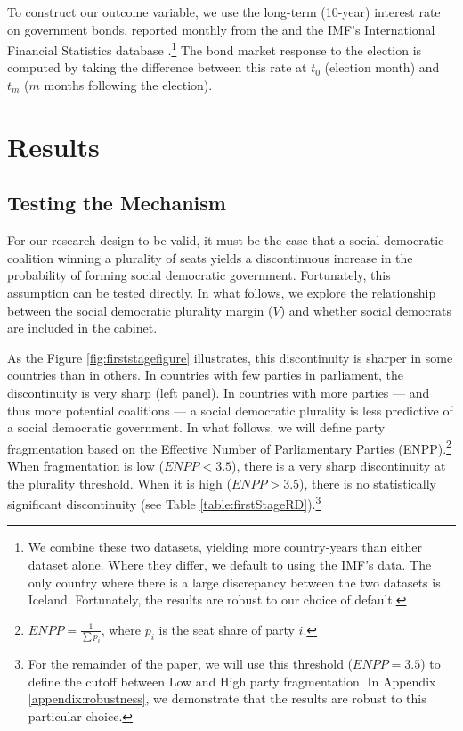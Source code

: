 \documentclass[12pt]{article}
\begin{document}
To construct our outcome variable, we use the long-term (10-year) interest rate on government bonds, reported monthly from the \citet{OECD2018} and the IMF's International Financial Statistics database \citep{IMF2018}.\footnote{We combine these two datasets, yielding more country-years than either dataset alone. Where they differ, we default to using the IMF's data. The only country where there is a large discrepancy between the two datasets is Iceland. Fortunately, the results are robust to our choice of default.} The bond market response to the election is computed by taking the difference between this rate at $t_0$ (election month) and $t_m$ ($m$ months following the election).


\section{Results}

\subsection{Testing the Mechanism}

For our research design to be valid, it must be the case that a social democratic coalition winning a plurality of seats yields a discontinuous increase in the probability of forming social democratic government. Fortunately, this assumption can be tested directly. In what follows, we explore the relationship between the social democratic plurality margin ($V$) and whether social democrats are included in the cabinet. 

As the Figure \ref{fig:firststagefigure} illustrates, this discontinuity is sharper in some countries than in others. In countries with few parties in parliament, the discontinuity is very sharp (left panel). In countries with more parties --- and thus more potential coalitions --- a social democratic plurality is less predictive of a social democratic government. In what follows, we will define party fragmentation based on the Effective Number of Parliamentary Parties (ENPP).\footnote{$ENPP = \frac{1}{\sum p_i}$, where $p_i$ is the seat share of party $i$.} When fragmentation is low ($ENPP < 3.5$), there is a very sharp discontinuity at the plurality threshold. When it is high ($ENPP > 3.5$), there is no statistically significant discontinuity (see Table \ref{table:firstStageRD}).\footnote{For the remainder of the paper, we will use this threshold ($ENPP = 3.5$) to define the cutoff between Low and High party fragmentation. In Appendix \ref{appendix:robustness}, we demonstrate that the results are robust to this particular choice.} 
\end{document}
